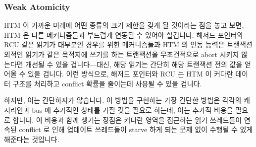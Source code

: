 \subsubsection{Weak Atomicity}
\label{sec:future:Weak Atomicity}

HTM 이 가까운 미래에 어떤 종류의 크기 제한을 갖게 될 것이라는 점을 놓고 보면,
HTM 은 다른 메커니즘들과 부드럽게 연동될 수 있어야 할겁니다.
해저드 포인터와 RCU 같은 읽기가 대부분인 경우를 위한 메커니즘들과 HTM 의 연동
능력은 트랜잭션 외적인 읽기가 같은 목적지에 쓰기를 하는 트랜잭션을 무조건적으로
abort 시키지 않는다면 개선될 수 있을 겁니다---대신, 해당 읽기는 간단히 해당
트랜잭션 전의 값을 얻어올 수 있을 겁니다.
이런 방식으로, 해저드 포인터와 RCU 는 HTM 이 커다란 데이터 구조를 처리하고
conflict 확률을 줄이는데 사용될 수 있을 겁니다.

하지만, 이는 간단하지가 않습니다.
이 방법을 구현하는 가장 간단한 방법은 각각의 캐시라인과 bus 에 추가적인 상태를
가질 것을 필요로 하는데, 이는 추가적 비용을 필요로 합니다.
이 비용과 함께 생기는 장점은 커다란 영역을 접근하는 읽기 쓰레드들이 연속된
conflict 로 인해 업데이트 쓰레드들이 starve 하게 되는 문제 없이 수행될 수 있게
해준다는 것입니다.
\iffalse

Given that HTM is likely to face some sort of size limitations for the
foreseeable future, it will be necessary for HTM to interoperate
smoothly with other mechanisms.
HTM's interoperability with read-mostly mechanisms such as hazard pointers
and RCU would be improved if extra-transactional reads did not
unconditionally abort transactions with conflicting writes---instead,
the read could simply be provided with the pre-transaction value.
In this way, hazard pointers and RCU could be used to allow HTM to handle
larger data structures and to reduce conflict probabilities.

This is not necessarily simple, however.
The most straightforward way of implementing this requires an additional
state in each cache line and on the bus, which is a non-trivial added
expense.
The benefit that goes along with this expense is permitting
large-footprint readers without the risk of starving updaters due
to continual conflicts.
An alternative approach, applied to great effect to binary search trees
by Siakavaras et al.~\cite{Siakavaras2017CombiningHA},
is to use RCU for read-only traversals and HTM
only for the actual updates themselves.
This combination outperformed other transactional-memory techniques by
up to 220\%, a speedup similar to that observed by
Howard and Walpole~\cite{PhilHoward2011RCUTMRBTree}
when they combined RCU with STM.
In both cases, the weak atomicity is implemented in software rather than
in hardware.
It would nevertheless be interesting to see what additional speedups
could be obtained by implementing weak atomicity in both hardware and
software.
\fi

